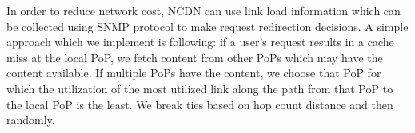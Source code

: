 {In order to reduce network cost, NCDN can use link load information which can be collected using SNMP protocol to make request redirection decisions. A simple approach which we implement is following:  if a user's request results in a cache miss at the local PoP, we fetch content from other PoPs  which may have the content available. If multiple PoPs have the content, we choose that PoP for which the utilization of the most utilized link  along the path from that PoP to the local PoP is the least. We break ties based on hop count distance and then randomly.

}







